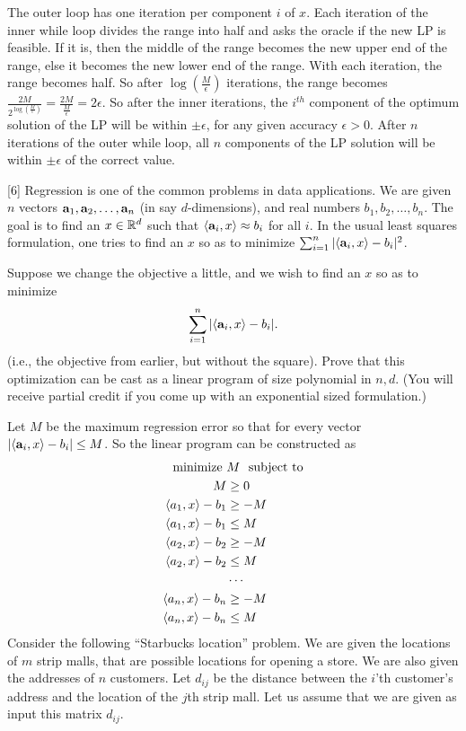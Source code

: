\documentclass[addpoints]{exam}
\begin{document}
\begin{questions}
The outer loop has one iteration per component $i$ of $x$. Each iteration of the inner while loop divides the range into half and asks the oracle if the new LP is feasible. If it is, then the middle of the range becomes the new upper end of the range, else it becomes the new lower end of the range. With each iteration, the range becomes half. So after $\log \left (\frac{M}{\epsilon} \right )$ iterations, the range becomes $\frac{2M}{2^{\log \left (\frac{M}{\epsilon} \right )}} = \frac{2M}{\frac{M}{\epsilon}}=2\epsilon$. So after the inner iterations, the $i^{th}$ component of the optimum solution of the LP will be within $\pm \epsilon$, for any given accuracy $\epsilon > 0$. After $n$ iterations of the outer while loop, all $n$ components of the LP solution will be within $\pm \epsilon$ of the correct value.

[6]
Regression is one of the common problems in data applications.  We are given $n$ vectors $\mathbf{a}_1, \mathbf{a}_2, \dots, \mathbf{a}_n$ (in say $d$-dimensions), and real numbers $b_1, b_2, \dots, b_n$.  The goal is to find an $x \in \mathbb{R}^d$ such that $\langle \mathbf{a}_i, x \rangle \approx b_i$ for all $i$. In the usual least squares formulation, one tries to find an $x$ so as to minimize $\sum_{i=1}^n | \langle \mathbf{a}_i, x \rangle - b_i|^2$.

Suppose we change the objective a little, and we wish to find an $x$ so as to minimize
\[ \sum_{i=1}^n | \langle \mathbf{a}_i, x \rangle - b_i|. \]
(i.e., the objective from earlier, but without the square).  Prove that this optimization can be cast as a linear program of size polynomial in $n, d$.  (You will receive partial credit if you come up with an exponential sized formulation.)

Let $M$ be the maximum regression error so that for every vector $|\langle \mathbf{a}_i, x \rangle - b_i| \leq M$. So the linear program can be constructed as
\begin{align*}
\text{minimize } &M ~~\text{subject to} \\
M &\geq 0\\
\langle a_1, x \rangle -b_1 &\ge -M \\
\langle a_1, x \rangle -b_1 &\le M \\
\langle a_2, x \rangle -b_2 &\ge -M \\
\langle a_2, x \rangle -b_2 &\le M \\
&\cdots \\
\langle a_n, x \rangle -b_n &\ge -M \\
\langle a_n, x \rangle -b_n &\le M \\
\end{align*}
Consider the following ``Starbucks location'' problem. We are given the locations of $m$ strip malls, that are possible locations for opening a store.  We are also given the addresses of $n$ customers.  Let $d_{ij}$ be the distance between the $i$'th customer's address and the location of the $j$th strip mall. Let us assume that we are given as input this matrix $d_{ij}$.


\end{questions}
\end{document}
